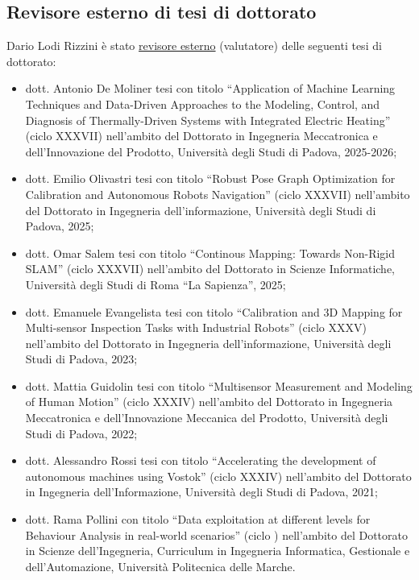 \documentclass[11pt]{article}
\begin{document}
\begin{itemize}
\section*{Revisore esterno di tesi di dottorato}

Dario Lodi Rizzini \`e stato \underline{revisore esterno} (valutatore) delle seguenti tesi di dottorato:  
%
\begin{itemize}
\item dott. Antonio De Moliner tesi con titolo ``Application of Machine Learning Techniques and Data-Driven Approaches to the Modeling, Control, and Diagnosis of Thermally-Driven Systems with Integrated Electric Heating'' (ciclo XXXVII) nell'ambito del Dottorato in Ingegneria Meccatronica e dell'Innovazione del Prodotto, Universit\`a degli Studi di Padova, 2025-2026; 
\item dott. Emilio Olivastri tesi con titolo ``Robust Pose Graph Optimization for Calibration and Autonomous Robots Navigation'' (ciclo XXXVII) nell'ambito del Dottorato in Ingegneria dell’informazione, Universit\`a degli Studi di Padova, 2025;
\item dott. Omar Salem tesi con titolo ``Continous Mapping: Towards Non-Rigid SLAM'' (ciclo XXXVII) nell'ambito del Dottorato in Scienze Informatiche, Universit\`a degli Studi di Roma ``La Sapienza'', 2025; 
\item dott. Emanuele Evangelista tesi con titolo ``Calibration and 3D Mapping for Multi-sensor Inspection Tasks with Industrial Robots'' (ciclo XXXV) nell'ambito del Dottorato in Ingegneria dell’informazione, Universit\`a degli Studi di Padova, 2023; 
\item dott. Mattia Guidolin tesi con titolo ``Multisensor Measurement and Modeling of Human Motion'' (ciclo XXXIV) nell'ambito del Dottorato in Ingegneria Meccatronica e dell'Innovazione Meccanica del Prodotto, Universit\`a degli Studi di Padova, 2022; 
\item dott. Alessandro Rossi tesi con titolo ``Accelerating the development of autonomous machines using Vostok'' (ciclo XXXIV) nell'ambito del Dottorato in Ingegneria dell'Informazione, Universit\`a degli Studi di Padova, 2021; 
\item dott. Rama Pollini con titolo ``Data exploitation at different levels for Behaviour Analysis in real-world scenarios'' (ciclo ) nell'ambito del Dottorato in Scienze dell'Ingegneria, Curriculum in Ingegneria Informatica, Gestionale e dell'Automazione, Universit\`a Politecnica delle Marche. 
\end{itemize}


\end{itemize}
\end{document}
